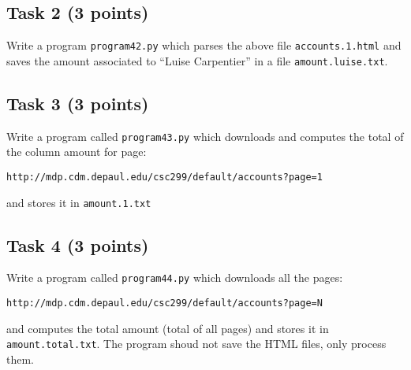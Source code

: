 \documentclass[12pt]{article}
\begin{document}
\subsection{Task 2 (3 points)}

Write a program {\tt program42.py} which parses the above file {\tt accounts.1.html} and saves the amount associated to ``Luise Carpentier'' in a file {\tt amount.luise.txt}.

\subsection{Task 3 (3 points)}

\noindent  Write a program called {\tt program43.py} which downloads and computes the total of the column amount for page:
\begin{verbatim}
http://mdp.cdm.depaul.edu/csc299/default/accounts?page=1
\end{verbatim}

\noindent and stores it in {\tt amount.1.txt}

\subsection{Task 4 (3 points)}

\noindent  Write a program called {\tt program44.py} which downloads all the pages:
\begin{verbatim}
http://mdp.cdm.depaul.edu/csc299/default/accounts?page=N
\end{verbatim}

\noindent and computes the total amount (total of all pages) and stores it in {\tt amount.total.txt}. The program shoud not save the HTML files, only process them.
\end{document}
